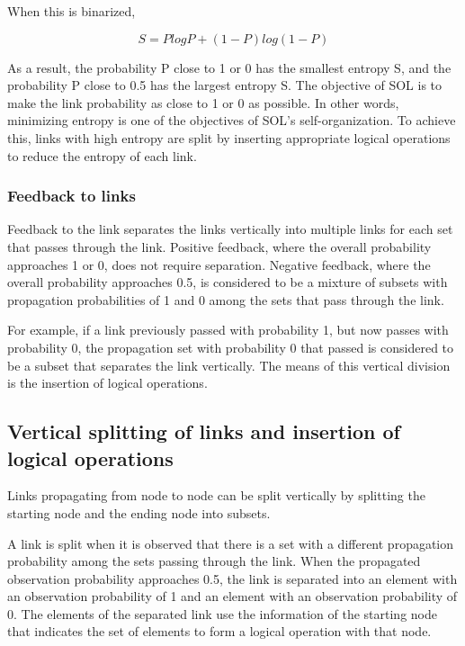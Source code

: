 \documentclass[12pt]{article}
\begin{document}
When this is binarized,

\[ S = P log P + (1-P) log (1-P) \]

As a result, the probability P close to 1 or 0 has the smallest entropy
S, and the probability P close to 0.5 has the largest entropy S. The
objective of SOL is to make the link probability as close to 1 or 0 as
possible. In other words, minimizing entropy is one of the objectives of
SOL's self-organization. To achieve this, links with high entropy are
split by inserting appropriate logical operations to reduce the entropy
of each link.

\subsubsection{Feedback to links}\label{feedback-to-links}

Feedback to the link separates the links vertically into multiple links
for each set that passes through the link. Positive feedback, where the
overall probability approaches 1 or 0, does not require separation.
Negative feedback, where the overall probability approaches 0.5, is
considered to be a mixture of subsets with propagation probabilities of
1 and 0 among the sets that pass through the link.

For example, if a link previously passed with probability 1, but now
passes with probability 0, the propagation set with probability 0 that
passed is considered to be a subset that separates the link vertically.
The means of this vertical division is the insertion of logical
operations.

\subsection{Vertical splitting of links and insertion of logical
operations}\label{vertical-splitting-of-links-and-insertion-of-logical-operations}

Links propagating from node to node can be split vertically by splitting
the starting node and the ending node into subsets.

A link is split when it is observed that there is a set with a different
propagation probability among the sets passing through the link. When
the propagated observation probability approaches 0.5, the link is
separated into an element with an observation probability of 1 and an
element with an observation probability of 0. The elements of the
separated link use the information of the starting node that indicates
the set of elements to form a logical operation with that node.
\end{document}
